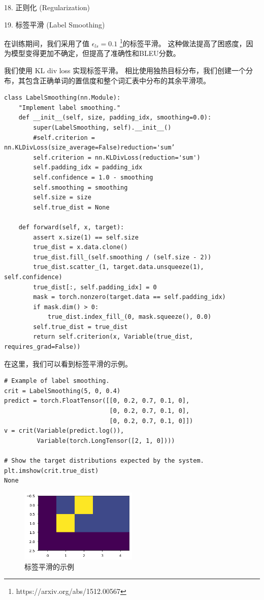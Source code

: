 18. 正则化 (Regularization)

19. 标签平滑 (Label Smoothing)

在训练期间，我们采用了值 $\epsilon_{l s}=0.1$ \footnote{https://arxiv.org/abs/1512.00567}的标签平滑。 这种做法提高了困惑度，因为模型变得更加不确定，但提高了准确性和BLEU分数。

我们使用 KL div loss 实现标签平滑。 相比使用独热目标分布，我们创建一个分布，其包含正确单词的置信度和整个词汇表中分布的其余平滑项。

\begin{Verbatim}
class LabelSmoothing(nn.Module):
    "Implement label smoothing."
    def __init__(self, size, padding_idx, smoothing=0.0):
        super(LabelSmoothing, self).__init__()
        #self.criterion = nn.KLDivLoss(size_average=False)reduction='sum’
        self.criterion = nn.KLDivLoss(reduction='sum')
        self.padding_idx = padding_idx
        self.confidence = 1.0 - smoothing
        self.smoothing = smoothing
        self.size = size
        self.true_dist = None
        
    def forward(self, x, target):
        assert x.size(1) == self.size
        true_dist = x.data.clone()
        true_dist.fill_(self.smoothing / (self.size - 2))
        true_dist.scatter_(1, target.data.unsqueeze(1), self.confidence)
        true_dist[:, self.padding_idx] = 0
        mask = torch.nonzero(target.data == self.padding_idx)
        if mask.dim() > 0:
            true_dist.index_fill_(0, mask.squeeze(), 0.0)
        self.true_dist = true_dist
        return self.criterion(x, Variable(true_dist, requires_grad=False))
\end{Verbatim}

在这里，我们可以看到标签平滑的示例。

\begin{Verbatim}
# Example of label smoothing.
crit = LabelSmoothing(5, 0, 0.4)
predict = torch.FloatTensor([[0, 0.2, 0.7, 0.1, 0],
                             [0, 0.2, 0.7, 0.1, 0], 
                             [0, 0.2, 0.7, 0.1, 0]])
v = crit(Variable(predict.log()), 
         Variable(torch.LongTensor([2, 1, 0])))

# Show the target distributions expected by the system.
plt.imshow(crit.true_dist)
None
\end{Verbatim}

\begin{figure}[htb]
\centering 
\includegraphics[width=0.5\textwidth]{img/n7.png} 
\caption{标签平滑的示例}
\label{Test}
\end{figure}

